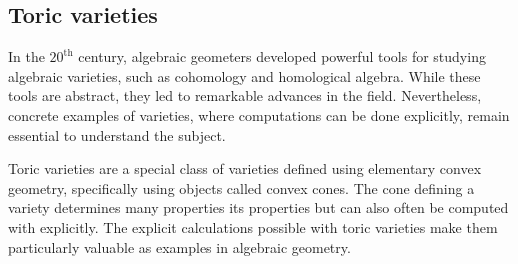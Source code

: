 \documentclass[12pt]{amsart}
\theoremstyle{plain}
\theoremstyle{definition}
\begin{document}
%

\newpage
\subsection*{Toric varieties}
In the $20^\text{th}$ century, algebraic geometers developed powerful tools for studying algebraic varieties, such as cohomology and homological algebra.
While these tools are abstract, they led to remarkable advances in the field.
Nevertheless, concrete examples of varieties, where computations can be done explicitly, remain essential to understand the subject.

Toric varieties are a special class of varieties defined using elementary convex geometry, specifically using objects called convex cones.
The cone defining a variety determines many properties its properties but can also often be computed with explicitly.
The explicit calculations possible with toric varieties make them particularly valuable as examples in algebraic geometry.
\end{document}
